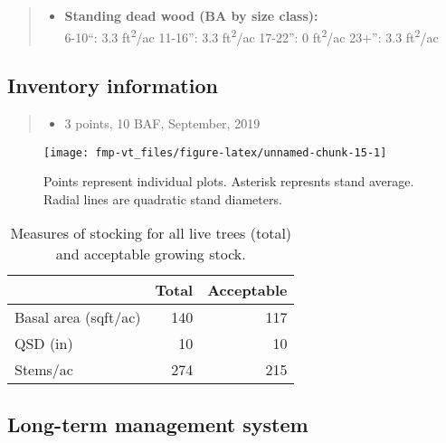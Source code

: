 \documentclass[]{tufte-handout}
\providecommand{\tightlist}{%
  \setlength{\itemsep}{0pt}\setlength{\parskip}{0pt}}
\begin{document}
\begin{quote}
\begin{itemize}
\tightlist
\item
  \textbf{Standing dead wood (BA by size class):}\\
  \vspace{2pt} \indent \small 6-10``: 3.3 ft\textsuperscript{2}/ac
  \textbar{} 11-16'': 3.3 ft\textsuperscript{2}/ac \textbar{} 17-22'': 0
  ft\textsuperscript{2}/ac \textbar{} 23+'': 3.3
  ft\textsuperscript{2}/ac
\end{itemize}
\end{quote}

\subsection{Inventory information}\label{inventory-information-2}

\begin{quote}
\begin{itemize}
\tightlist
\item
  3 points, 10 BAF, September, 2019
\end{itemize}
\end{quote}

\begin{figure}
\texttt{[image: fmp-vt\_files/figure-latex/unnamed-chunk-15-1]} \caption[Points represent individual plots]{Points represent individual plots. Asterisk represnts stand average. Radial lines are quadratic stand diameters.}\label{fig:unnamed-chunk-15}
\end{figure}

\begin{table}

\caption{\label{tab:unnamed-chunk-16}Measures of stocking for all live trees (total) and acceptable growing stock.}
\centering
\begin{tabular}[t]{lrr}
\toprule
  & Total & Acceptable\\
\midrule
Basal area (sqft/ac) & 140 & 117\\
QSD (in) & 10 & 10\\
Stems/ac & 274 & 215\\
\bottomrule
\end{tabular}
\end{table}

\subsection{Long-term management
system}\label{long-term-management-system-2}
\end{document}
